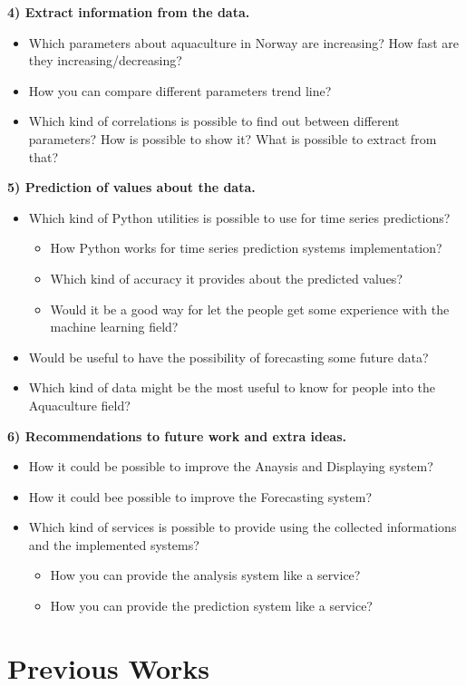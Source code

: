 \textbf{4) Extract information from the data.}
\vspace{-5mm}
\begin{itemize}
 \setlength{\itemsep}{-5pt}
  \item Which parameters about aquaculture in Norway are increasing? How fast are they increasing/decreasing? 
  \item How you can compare different parameters trend line?
  \item Which kind of correlations is possible to find out between different parameters? How is possible to show it? What is possible to extract from that?
 \end{itemize}
 
 \newpage
 
\textbf{5) Prediction of values about the data.}
\vspace{-5mm}
\begin{itemize}
 \setlength{\itemsep}{-5pt} 
  \item Which kind of Python utilities is possible to use for time series predictions?
  		\vspace{-3mm}
		\begin{itemize}
 		\setlength{\itemsep}{-5pt}	
		  \item How Python works for time series prediction systems implementation?
		  \item Which kind of accuracy it provides about the predicted values?
		  \item Would it be a good way for let the people get some experience with the machine learning field? 
		\end{itemize}
  \item Would be useful to have the possibility of forecasting some future data? 
  \item Which kind of data might be the most useful to know for people into the Aquaculture field?
	
 \end{itemize}

\textbf{6) Recommendations to future work and extra ideas.}
\vspace{-5mm}
\begin{itemize}
\setlength{\itemsep}{-5pt}
	\item How it could be possible to improve the Anaysis and Displaying system?
	\item How it could bee possible to improve the Forecasting system?
	\item Which kind of services is possible to provide using the collected informations and the implemented systems?
  		\vspace{-3mm}
		\begin{itemize}
 		\setlength{\itemsep}{-5pt}	
		  	\item How you can provide the analysis system like a service?
		  	\item How you can provide the prediction system like a service?
		\end{itemize}
 \end{itemize}

\section{Previous Works}


